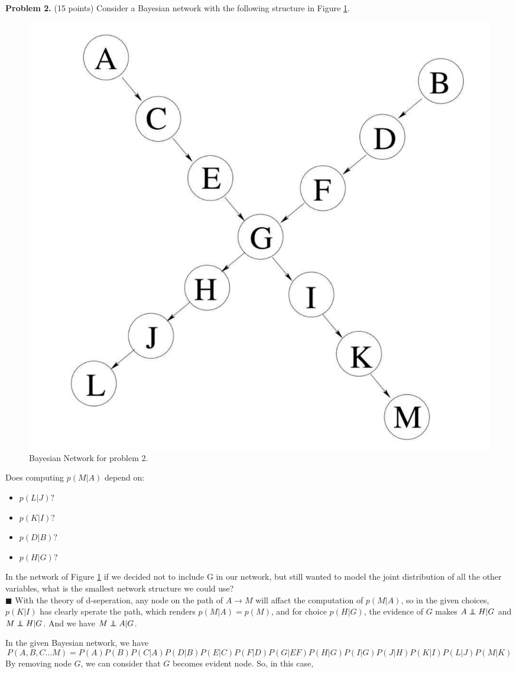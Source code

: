 \documentclass{article}
\newcommand{\solution}[1]{~\\ $\blacksquare$ \sffamily\upshape\selectfont #1
\normalfont ~\\~ }
\newcommand\independent{\protect\mathpalette{\protect\independenT}{\perp}}
\def\independenT#1#2{\mathrel{\rlap{$#1#2$}\mkern2mu{#1#2}}}
\begin{document}
\textbf{Problem 2.} (15 points) Consider a Bayesian network with the
following structure in Figure \ref{fig:final_2.1}.
\begin{figure}[ht]
  \centering
  \includegraphics[width=.5\textwidth]{AI-FINAL-2_1.pdf}
  \caption{Bayesian Network for problem 2.}\label{fig:final_2.1}
\end{figure}
Does computing $p(M|A)$ depend on:
\begin{itemize}
  \item $p(L|J)?$
  \item $p(K|I)?$
  \item $p(D|B)?$
  \item $p(H|G)?$
\end{itemize}
In the network of Figure \ref{fig:final_2.1} if we decided not to
include G in our network, but still wanted to model the joint
distribution of all the other variables, what is the smallest network
structure we could use?
\solution{
  With the theory of d-seperation, any node on the path of $A\rightarrow M$
  will affact the computation of $p(M|A)$, so in the given choices,
  $p(K|I)$ has clearly sperate the path, which renders $p(M|A) =
  p(M)$, and for choice $p(H|G)$, the evidence of $G$ makes
  $A\independent H | G$ and $M\independent H | G$. And we have 
  $M\independent A | G$. 

  In the given Bayesian network, we have 
  \[ P(A,B,C...M) = P(A)P(B)P(C|A)P(D|B)P(E|C)P(F|D)
  P(G|EF)P(H|G)P(I|G)P(J|H)P(K|I)P(L|J)P(M|K) \]
  By removing node $G$, we can consider that $G$ becomes evident
  node. So, in this case, 

  
}
\end{document}
